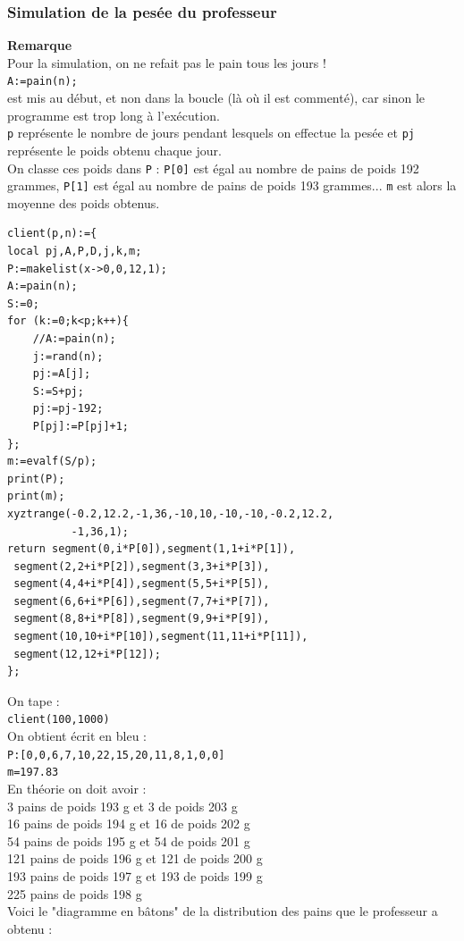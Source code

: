 \documentclass[a4paper,11pt]{book}
\begin{document}
\subsubsection{Simulation de la pes\'ee du professeur}
{\bf Remarque}\\
Pour la simulation, on ne refait pas le pain tous les jours ! \\
{\tt  A:=pain(n);}\\
est mis au d\'ebut, et non dans la boucle (l\`a o\`u il est comment\'e),
 car sinon le programme est trop long \`a l'ex\'ecution.\\
{\tt p} repr\'esente le nombre de jours pendant lesquels on effectue la pes\'ee
et {\tt pj} repr\'esente le poids obtenu chaque jour.\\
On classe ces poids dans {\tt P} : {\tt P[0]} est \'egal au nombre de pains
 de poids 192 grammes, {\tt P[1]} est \'egal au nombre de pains de poids
 193 grammes...
{\tt m} est alors la moyenne des poids obtenus.        
\begin{verbatim}
client(p,n):={
local pj,A,P,D,j,k,m;
P:=makelist(x->0,0,12,1);
A:=pain(n);
S:=0;
for (k:=0;k<p;k++){
    //A:=pain(n);
    j:=rand(n);	
    pj:=A[j];
    S:=S+pj;
    pj:=pj-192;
    P[pj]:=P[pj]+1;
};
m:=evalf(S/p);
print(P);
print(m);
xyztrange(-0.2,12.2,-1,36,-10,10,-10,-10,-0.2,12.2,
          -1,36,1);
return segment(0,i*P[0]),segment(1,1+i*P[1]),
 segment(2,2+i*P[2]),segment(3,3+i*P[3]),
 segment(4,4+i*P[4]),segment(5,5+i*P[5]),
 segment(6,6+i*P[6]),segment(7,7+i*P[7]),
 segment(8,8+i*P[8]),segment(9,9+i*P[9]),
 segment(10,10+i*P[10]),segment(11,11+i*P[11]),
 segment(12,12+i*P[12]);
}; 
\end{verbatim}
On tape :\\
{\tt client(100,1000)}\\
On obtient \'ecrit en bleu :\\
{\tt P:[0,0,6,7,10,22,15,20,11,8,1,0,0]}\\
{\tt m=197.83}\\
En th\'eorie on doit avoir :\\
3 pains de poids 193 g et 3 de poids 203 g\\
16 pains de poids 194 g et 16 de poids 202 g\\
54 pains de poids 195 g et 54 de poids 201 g\\
121 pains de poids 196 g et 121 de poids 200 g\\
193 pains de poids 197 g et 193 de poids 199 g\\
225 pains de poids 198 g \\
Voici le "diagramme en b\^atons" de la distribution des pains 
 que le professeur a obtenu :\\
\end{document}

